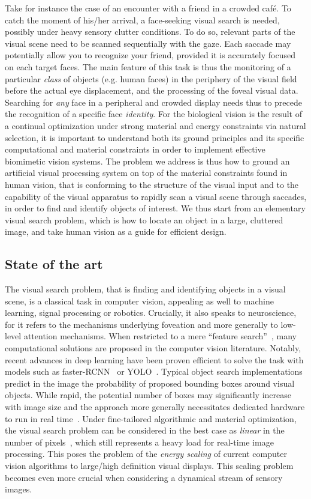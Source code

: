 Take for instance the case of an encounter with a friend in a crowded café. To catch the moment of his/her arrival, a face-seeking visual search is needed, possibly under heavy sensory clutter conditions. To do so, relevant parts of the visual scene need to be scanned sequentially with the gaze. Each saccade may potentially allow you to recognize your friend, provided it is accurately focused on each target faces. The main feature of this task is thus the monitoring of a particular \emph{class} of objects (e.g. human faces) in the periphery of the visual field before the actual eye displacement, and the processing of the foveal visual data. Searching for \emph{any} face in a peripheral and crowded display needs thus to precede the recognition of a specific face \emph{identity}.
%
For the biological vision is the result of a continual optimization under strong material and energy constraints via natural selection, it is important to understand both its ground principles and its specific computational and material constraints in order to implement effective biomimetic vision systems. The problem we address is thus how to ground an artificial visual processing system on top of the material constraints found in human vision, that is conforming to the structure of the visual input and to the capability of the visual apparatus to rapidly scan a visual scene through saccades, in order to find and identify objects of interest. We thus start from an elementary visual search problem, which is how to locate an object in a large, cluttered image, and take human vision as a guide for efficient design.
%
\subsection{State of the art}
The visual search problem, that is finding and identifying objects in a visual scene, is a classical task in computer vision, appealing as well to machine learning, signal processing or robotics. Crucially, it also speaks to neuroscience, for it refers to the mechanisms underlying foveation and more generally to low-level attention mechanisms. When restricted to a mere ``feature search''~\cite{Treisman80}, many computational solutions are proposed in the computer vision literature. Notably, recent advances in deep learning have been proven efficient to solve the task with models such as faster-RCNN~\cite{Ren17} or YOLO~\cite{Redmon16}. Typical object search implementations predict in the image the probability of proposed bounding boxes around visual objects. While rapid, the potential number of boxes may significantly increase with image size and the approach more generally necessitates dedicated hardware to run in real time~\cite{feng2019computer}. Under fine-tailored algorithmic and material optimization, the visual search problem can be considered in the best case as \emph{linear} in the number of pixels~\cite{strengert2006pyramid}, which still represents a heavy load for real-time image processing. This poses the problem of the \emph{energy scaling} of current computer vision algorithms to large/high definition visual displays. This scaling problem becomes even more crucial when considering a dynamical stream of sensory images. %

